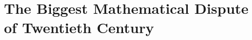 \documentclass[elemannt.tex]{subfile}
\begin{document}
	\chapter{The Biggest Mathematical Dispute of Twentieth Century}\label{ch:dispute}
\end{document}
